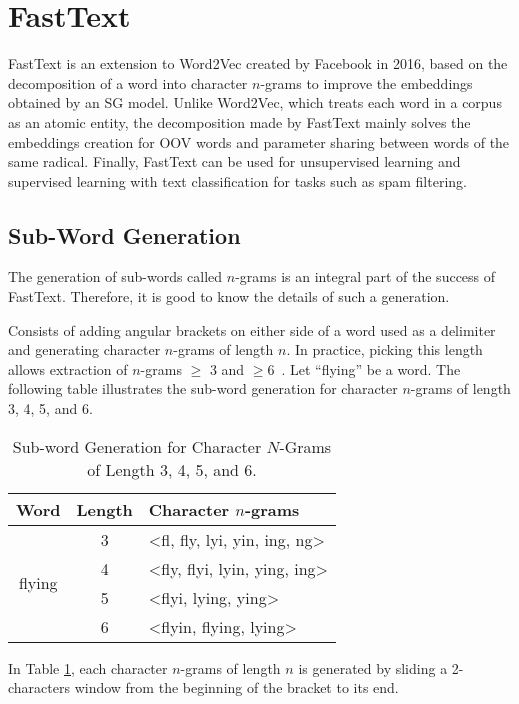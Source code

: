 
\section{FastText}
\label{sec:fasttext}

FastText is an extension to Word2Vec created by Facebook in 2016, based on the
decomposition of a word into character $n$-grams to improve the embeddings
obtained by an SG model. Unlike Word2Vec, which treats each word in a corpus as
an atomic entity, the decomposition made by FastText mainly solves the
embeddings creation for OOV words and parameter sharing between words of the
same radical. Finally, FastText can be used for unsupervised learning and
supervised learning with text classification for tasks such as spam filtering.

\subsection{Sub-Word Generation}
\label{subsec:fasttext:sub-word}

The generation of sub-words called $n$-grams is an integral part of the success
of FastText. Therefore, it is good to know the details of such a generation.

\begin{definition}
  Consists of adding angular brackets on either side of a word used as a
  delimiter and generating character $n$-grams of length $n$. In practice, picking
  this length allows extraction of $n$-grams $\geq$ 3 and $\geq
  6$~\citep{DBLP:journals/tacl/BojanowskiGJM17}. Let ``flying'' be a word. The
  following table illustrates the sub-word generation for character $n$-grams of
  length 3, 4, 5, and 6.

  \begin{table}[!ht]
    \centering
    \caption{Sub-word Generation for Character $N$-Grams of Length 3, 4, 5, and 6.}
    \label{tab:fasttext:sub-word}
    \begin{tabular}{ccl}
      \toprule
      \textbf{Word} & \textbf{Length} & \textbf{Character $n$-grams} \\
      \midrule
      \multirow{4}{*}{flying} & 3 & <fl, fly, lyi, yin, ing, ng> \\
                    & 4 & <fly, flyi, lyin, ying, ing> \\
                    & 5 & <flyi, lying, ying> \\
                    & 6 & <flyin, flying, lying> \\
      \bottomrule
    \end{tabular}
  \end{table}

  In Table \ref{tab:fasttext:sub-word}, each character $n$-grams of length $n$
  is generated by sliding a 2-characters window from the beginning of the bracket
  to its end.
  \label{def:sub-word:generation}
\end{definition}

